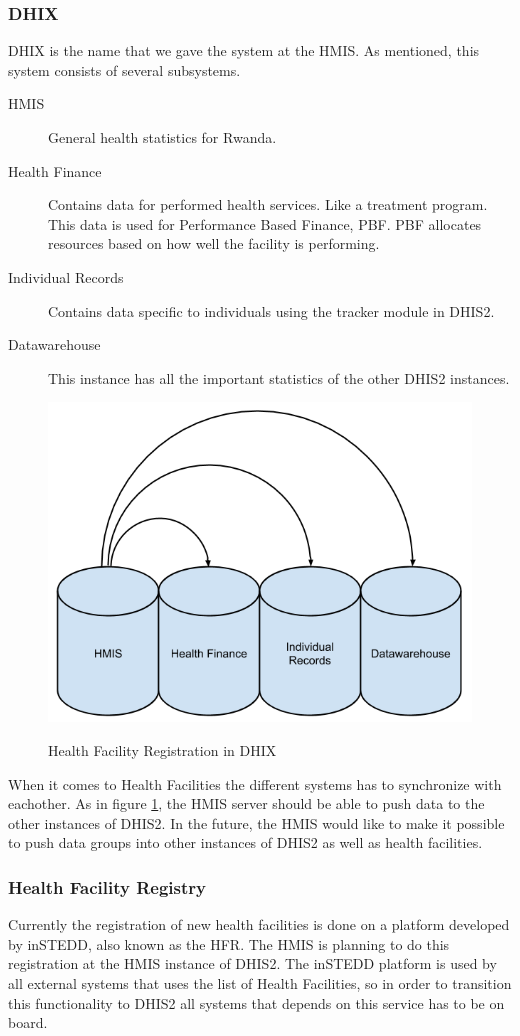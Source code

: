 \subsubsection{DHIX}
DHIX is the name that we gave the system at the HMIS. As mentioned, this system consists of several subsystems.
\begin{description}
\item[HMIS]General health statistics for Rwanda. 
\item[Health Finance]Contains data for performed health services. Like a treatment program. This data is used for Performance Based Finance, PBF. PBF allocates resources based on how well the facility is performing.
\item[Individual Records]Contains data specific to individuals using the tracker module in DHIS2.
\item[Datawarehouse]This instance has all the important statistics of the other DHIS2 instances.
\end{description}
\begin{figure}
\centering
\includegraphics[width=12cm]{empirical/images/hfr_dhix}
\label{hfr_dhix}
\caption{Health Facility Registration in DHIX}
\end{figure}
When it comes to Health Facilities the different systems has to synchronize with eachother. As in figure \ref{hfr_dhix}, the HMIS server should be able to push data to the other instances of DHIS2. In the future, the HMIS would like to make it possible to push data groups into other instances of DHIS2 as well as health facilities.
\subsubsection{Health Facility Registry}
Currently the registration of new health facilities is done on a platform developed by inSTEDD, also known as the HFR. The HMIS is planning to do this registration at the HMIS instance of DHIS2. The inSTEDD platform is used by all external systems that uses the list of Health Facilities, so in order to transition this functionality to DHIS2 all systems that  depends on this service has to be on board. 